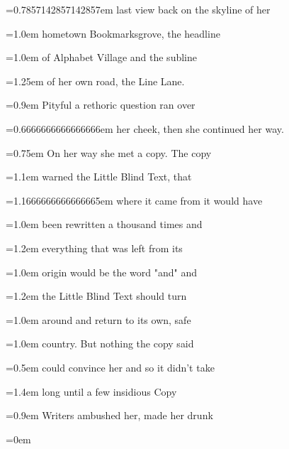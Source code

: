 \documentclass{article}
\begin{document}
 \font=0.7857142857142857em last view back on the skyline of her 

 \font=1.0em hometown Bookmarksgrove, the headline 

 \font=1.0em of Alphabet Village and the subline 

 \font=1.25em of her own road, the Line Lane. 

 \font=0.9em Pityful a rethoric question ran over 

 \font=0.6666666666666666em her cheek, then she continued her way. 

 \font=0.75em On her way she met a copy. The copy 

 \font=1.1em warned the Little Blind Text, that 

 \font=1.1666666666666665em where it came from it would have 

 \font=1.0em been rewritten a thousand times and 

 \font=1.2em everything that was left from its 

 \font=1.0em origin would be the word "and" and 

 \font=1.2em the Little Blind Text should turn 

 \font=1.0em around and return to its own, safe 

 \font=1.0em country. But nothing the copy said 

 \font=0.5em could convince her and so it didn’t take 

 \font=1.4em long until a few insidious Copy 

 \font=0.9em Writers ambushed her, made her drunk 

 \font=0em
\end{document}
